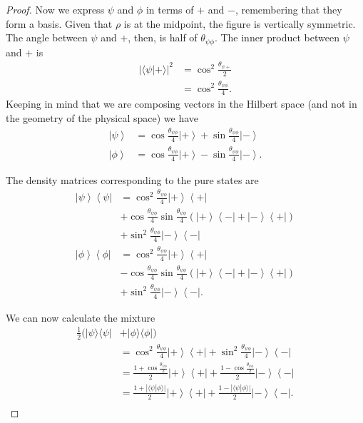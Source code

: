 \documentclass[10pt,twocolumn, nofootinbib]{revtex4-2}
\begin{document}
\begin{proof}
Now we express $\psi$ and $\phi$ in terms of $+$ and $-$, remembering that they form a basis. Given that $\rho$ is at the midpoint, the figure is vertically symmetric. The angle between $\psi$ and $+$, then, is half of $\theta_{\psi\phi}$. The inner product between $\psi$ and $+$ is
\begin{equation}
	\begin{aligned}
		|\langle \psi | + \rangle |^2 &= \cos^2 \frac{\theta_{\psi +}}{2} \\
		&= \cos^2 \frac{\theta_{\psi\phi}}{4}.
	\end{aligned}
\end{equation}
Keeping in mind that we are composing vectors in the Hilbert space (and not in the geometry of the physical space) we have
\begin{align*}
	\left|\psi\right>&=\cos\frac{\theta_{\psi\phi}}{4}\left|+\right>+\sin\frac{\theta_{\psi\phi}}{4}\left|-\right> \\
	\left|\phi\right>&=\cos\frac{\theta_{\psi\phi}}{4}\left|+\right>-\sin\frac{\theta_{\psi\phi}}{4}\left|-\right>.
\end{align*}

The density matrices corresponding to the pure states are
\begin{align*}
	\left|\psi\right>\left<\psi\right|&=\cos^2\frac{\theta_{\psi\phi}}{4}\left|+\right>\left<+\right|\\
	&+\cos\frac{\theta_{\psi\phi}}{4}\sin\frac{\theta_{\psi\phi}}{4}\left(\left|+\right>\left<-\right|+\left|-\right>\left<+\right|\right) \\
	&+\sin^2\frac{\theta_{\psi\phi}}{4}\left|-\right>\left<-\right| \\
	\left|\phi\right>\left<\phi\right|&=\cos^2\frac{\theta_{\psi\phi}}{4}\left|+\right>\left<+\right|\\
	&-\cos\frac{\theta_{\psi\phi}}{4}\sin\frac{\theta_{\psi\phi}}{4}\left(\left|+\right>\left<-\right|+\left|-\right>\left<+\right|\right) \\
	&+\sin^2\frac{\theta_{\psi\phi}}{4}\left|-\right>\left<-\right|.
\end{align*}

We can now calculate the mixture
\begin{align*}
	\frac{1}{2}(|\psi\rangle\langle\psi| &+ |\phi\rangle\langle\phi|) \\
	&=\cos^2\frac{\theta_{\psi\phi}}{4}\left|+\right>\left<+\right| +\sin^2\frac{\theta_{\psi\phi}}{4}\left|-\right>\left<-\right| \\
	&=\frac{1+\cos\frac{\theta_{\psi\phi}}{2}}{2}\left|+\right>\left<+\right| +\frac{1-\cos\frac{\theta_{\psi\phi}}{2}}{2}\left|-\right>\left<-\right| \\
	&=\frac{1+|\langle\psi|\phi\rangle|}{2}\left|+\right>\left<+\right| +\frac{1-|\langle\psi|\phi\rangle|}{2}\left|-\right>\left<-\right|. \\
\end{align*}


\end{proof}
\end{document}

